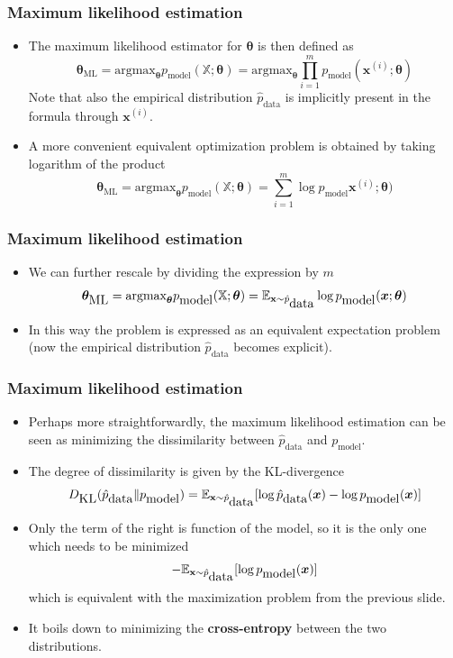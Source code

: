 \documentclass[notes]{beamer}          %
\newcommand{\vect}[1]{\bm{#1}}
\newcommand{\field}[1]{\mathbb{#1}}
\begin{document}
\begin{frame}
\frametitle{Maximum likelihood estimation}
    \begin{itemize}
        \item The maximum likelihood estimator for $\vect{\theta}$ is then defined as
        $$
        \vect{\theta}_{\mbox{ML}} = \mbox{argmax}_{\vect{\theta}} p_{\mbox{model}}(\field{X};\vect{\theta}) =  \mbox{argmax}_{\vect{\theta}} \prod_{i = 1}^{m} p_{\mbox{model}}(\vect{x}^{(i)};\vect{\theta})
        $$
        Note that also the empirical distribution $\hat{p}_{\mbox{data}}$ is implicitly present in the formula through $\vect{x}^{(i)}$.
        \item A more convenient equivalent optimization problem is obtained by taking logarithm of the product
        $$
        \vect{\theta}_{\mbox{ML}} = \mbox{argmax}_{\vect{\theta}} p_{\mbox{model}}(\field{X};\vect{\theta}) = \sum_{i=1}^{m} \log p_{\mbox{model}}\vect{x}^{(i)};\vect{\theta})
        $$
    \end{itemize}
\end{frame}


\begin{frame}
\frametitle{Maximum likelihood estimation}
    \begin{itemize}
        \item We can further rescale by dividing the expression by $m$
        $$
        \vect{\theta}_{\mbox{ML}} = \mbox{argmax}_{\vect{\theta}} p_{\mbox{model}}(\field{X};\vect{\theta}) = \field{E}_{\text{\bf x} \sim  \hat{p}_{\mbox{data}}} \log p_{\mbox{model}}(\vect{x};\vect{\theta})
        $$
        \item In this way the problem is expressed as an equivalent expectation problem (now the empirical distribution $\hat{p}_{\mbox{data}}$ becomes explicit).
    \end{itemize}
\end{frame}


\begin{frame}
\frametitle{Maximum likelihood estimation}
    \begin{itemize}
        \item Perhaps more straightforwardly, the maximum likelihood estimation can be seen as minimizing the dissimilarity between $\hat{p}_{\mbox{data}}$ and $p_{\mbox{model}}$.
        \item The degree of dissimilarity is given by the KL-divergence
        $$
        D_{\mbox{KL}} (\hat{p}_{\mbox{data}} \lVert p_{\mbox{model}}) = \field{E}_{\text{\bf x} \sim  \hat{p}_{\mbox{data}}} [\log \hat{p}_{\mbox{data}}(\vect{x}) - \log p_{\mbox{model}}(\vect{x})]
        $$
        \item Only the term of the right is function of the model, so it is the only one which needs to be minimized
        $$
        - \field{E}_{\text{\bf x} \sim  \hat{p}_{\mbox{data}}} [\log p_{\mbox{model}}(\vect{x})]
        $$
        which is equivalent with the maximization problem from the previous slide.
        \item It boils down to minimizing the {\bf cross-entropy} between the two distributions.
    \end{itemize}
\end{frame}
\end{document}
